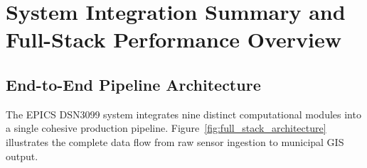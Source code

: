 
\section{System Integration Summary and Full-Stack Performance Overview}
\label{sec:system_integration_summary}

\subsection{End-to-End Pipeline Architecture}
The EPICS DSN3099 system integrates nine distinct computational modules into a single cohesive production pipeline. Figure~\ref{fig:full_stack_architecture} illustrates the complete data flow from raw sensor ingestion to municipal GIS output.

